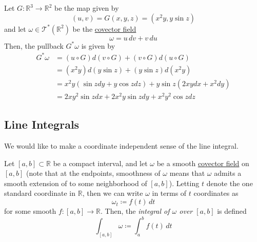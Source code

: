 \documentclass{article}
\newcounter{definition}[section]
\newcounter{example}[section]
\begin{document}
    \begin{example}
      \label{ex:computing-a-pullback}
    Let $G: \mathbb{R}^3 \to \mathbb{R}^2$ be the map given by 
    \begin{equation}
      (u, v) = G(x, y, z) = (x^2 y, y \sin{z})
    \end{equation}
    and let $\omega \in \mathcal{T}^*(\mathbb{R}^2)$ be the \hyperref[def:covector-field]{covector field} 
    \begin{equation}
      \omega = u \,dv + v\,du
    \end{equation}
    Then, the pullback $G^* \omega$ is given by 
    \begin{align*}
        G^* \omega & = (u \circ G) d(v \circ G) + (v \circ G) d (u \circ G) \\
        & = (x^2 y) d(y \sin{z}) + (y \sin{z}) d (x^2 y) \\
        & = x^2 y (\sin{z} dy + y \cos{z} dz) + y \sin{z} (2xy dx + x^2 dy) \\
        & = 2xy^2 \sin{z} dx + 2x^2 y \sin{z} dy + x^2 y^2 \cos{z} dz
    \end{align*}
    \end{example}

  \subsection{Line Integrals}

    We would like to make a coordinate independent sense of the line integral. 

    \begin{definition}
      \label{def:integral-of-a-covector-field-over-an-interval}
    Let $[a, b] \subset \mathbb{R}$ be a compact interval, and let $\omega$ be a smooth \hyperref[def:covector-field]{covector field} on $[a,b]$ (note that at the endpoints, smoothness of $\omega$ means that $\omega$ admits a smooth extension of to some neighborhood of $[a,b]$). Letting $t$ denote the one standard coordinate in $\mathbb{R}$, then we can write $\omega$ in terms of $t$ coordinates as 
    \begin{equation}
      \omega_t \coloneqq f(t)\,dt
    \end{equation}
    for some smooth $f: [a,b] \to \mathbb{R}$. Then, the \textit{integral of $\omega$ over $[a,b]$} is defined 
    \begin{equation}
      \int_{[a,b]} \omega \coloneqq \int_a^b f(t)\,dt
    \end{equation}
    \end{definition}
\end{document}
